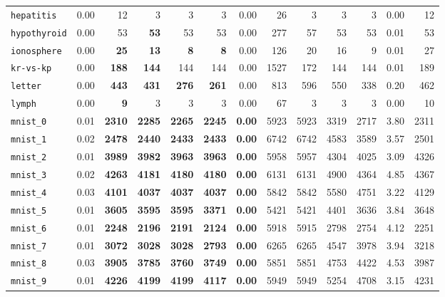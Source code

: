 \begin{tabular}{lrrrrrrrrrrrr}
\texttt{hepatitis} & 0.00 & 12 & 3 & 3 & 3 & 0.00 & 26 & 3 & 3 & 3 & 0.00 & 12\\
\texttt{hypothyroid} & 0.00 & 53 & \textbf{53} & 53 & 53 & 0.00 & 277 & 57 & 53 & 53 & 0.01 & 53\\
\texttt{ionosphere} & 0.00 & \textbf{25} & \textbf{13} & \textbf{8} & \textbf{8} & 0.00 & 126 & 20 & 16 & 9 & 0.01 & 27\\
\texttt{kr-vs-kp} & 0.00 & \textbf{188} & \textbf{144} & 144 & 144 & 0.00 & 1527 & 172 & 144 & 144 & 0.01 & 189\\
\texttt{letter} & 0.00 & \textbf{443} & \textbf{431} & \textbf{276} & \textbf{261} & 0.00 & 813 & 596 & 550 & 338 & 0.20 & 462\\
\texttt{lymph} & 0.00 & \textbf{9} & 3 & 3 & 3 & 0.00 & 67 & 3 & 3 & 3 & 0.00 & 10\\
\texttt{mnist\_0} & 0.01 & \textbf{2310} & \textbf{2285} & \textbf{2265} & \textbf{2245} & \textbf{0.00} & 5923 & 5923 & 3319 & 2717 & 3.80 & 2311\\
\texttt{mnist\_1} & 0.02 & \textbf{2478} & \textbf{2440} & \textbf{2433} & \textbf{2433} & \textbf{0.00} & 6742 & 6742 & 4583 & 3589 & 3.57 & 2501\\
\texttt{mnist\_2} & 0.01 & \textbf{3989} & \textbf{3982} & \textbf{3963} & \textbf{3963} & \textbf{0.00} & 5958 & 5957 & 4304 & 4025 & 3.09 & 4326\\
\texttt{mnist\_3} & 0.02 & \textbf{4263} & \textbf{4181} & \textbf{4180} & \textbf{4180} & \textbf{0.00} & 6131 & 6131 & 4900 & 4364 & 4.85 & 4367\\
\texttt{mnist\_4} & 0.03 & \textbf{4101} & \textbf{4037} & \textbf{4037} & \textbf{4037} & \textbf{0.00} & 5842 & 5842 & 5580 & 4751 & 3.22 & 4129\\
\texttt{mnist\_5} & 0.01 & \textbf{3605} & \textbf{3595} & \textbf{3595} & \textbf{3371} & \textbf{0.00} & 5421 & 5421 & 4401 & 3636 & 3.84 & 3648\\
\texttt{mnist\_6} & 0.01 & \textbf{2248} & \textbf{2196} & \textbf{2191} & \textbf{2124} & \textbf{0.00} & 5918 & 5915 & 2798 & 2754 & 4.12 & 2251\\
\texttt{mnist\_7} & 0.01 & \textbf{3072} & \textbf{3028} & \textbf{3028} & \textbf{2793} & \textbf{0.00} & 6265 & 6265 & 4547 & 3978 & 3.94 & 3218\\
\texttt{mnist\_8} & 0.03 & \textbf{3905} & \textbf{3785} & \textbf{3760} & \textbf{3749} & \textbf{0.00} & 5851 & 5851 & 4753 & 4422 & 4.53 & 3987\\
\texttt{mnist\_9} & 0.01 & \textbf{4226} & \textbf{4199} & \textbf{4199} & \textbf{4117} & \textbf{0.00} & 5949 & 5949 & 5254 & 4708 & 3.15 & 4231\\

\end{tabular}
